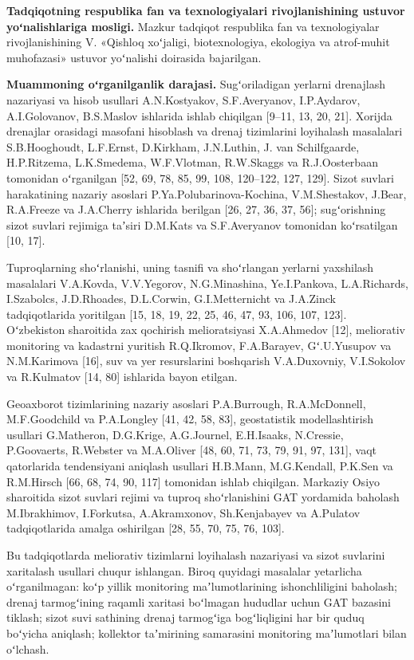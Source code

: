 \documentclass[14pt,a4paper,oneside]{extreport}
\begin{document}
\textbf{Tadqiqotning respublika fan va texnologiyalari rivojlanishining
ustuvor yoʻnalishlariga mosligi.} Mazkur tadqiqot respublika fan va
texnologiyalar rivojlanishining V. «Qishloq xoʻjaligi, biotexnologiya,
ekologiya va atrof-muhit muhofazasi» ustuvor yoʻnalishi doirasida
bajarilgan.

\textbf{Muammoning oʻrganilganlik darajasi.} Sugʻoriladigan yerlarni
drenajlash nazariyasi va hisob usullari A.N.Kostyakov, S.F.Averyanov,
I.P.Aydarov, A.I.Golovanov, B.S.Maslov ishlarida ishlab chiqilgan
{[}9--11, 13, 20, 21{]}. Xorijda drenajlar orasidagi masofani hisoblash
va drenaj tizimlarini loyihalash masalalari S.B.Hooghoudt, L.F.Ernst,
D.Kirkham, J.N.Luthin, J. van Schilfgaarde, H.P.Ritzema, L.K.Smedema,
W.F.Vlotman, R.W.Skaggs va R.J.Oosterbaan tomonidan oʻrganilgan {[}52,
69, 78, 85, 99, 108, 120--122, 127, 129{]}. Sizot suvlari harakatining
nazariy asoslari P.Ya.Polubarinova-Kochina, V.M.Shestakov, J.Bear,
R.A.Freeze va J.A.Cherry ishlarida berilgan {[}26, 27, 36, 37, 56{]};
sugʻorishning sizot suvlari rejimiga taʼsiri D.M.Kats va S.F.Averyanov
tomonidan koʻrsatilgan {[}10, 17{]}.

Tuproqlarning shoʻrlanishi, uning tasnifi va shoʻrlangan yerlarni
yaxshilash masalalari V.A.Kovda, V.V.Yegorov, N.G.Minashina,
Ye.I.Pankova, L.A.Richards, I.Szabolcs, J.D.Rhoades, D.L.Corwin,
G.I.Metternicht va J.A.Zinck tadqiqotlarida yoritilgan {[}15, 18, 19,
22, 25, 46, 47, 93, 106, 107, 123{]}. Oʻzbekiston sharoitida zax
qochirish melioratsiyasi X.A.Ahmedov {[}12{]}, meliorativ monitoring va
kadastrni yuritish R.Q.Ikromov, F.A.Barayev, Gʻ.U.Yusupov va
N.M.Karimova {[}16{]}, suv va yer resurslarini boshqarish V.A.Duxovniy,
V.I.Sokolov va R.Kulmatov {[}14, 80{]} ishlarida bayon etilgan.

Geoaxborot tizimlarining nazariy asoslari P.A.Burrough, R.A.McDonnell,
M.F.Goodchild va P.A.Longley {[}41, 42, 58, 83{]}, geostatistik
modellashtirish usullari G.Matheron, D.G.Krige, A.G.Journel, E.H.Isaaks,
N.Cressie, P.Goovaerts, R.Webster va M.A.Oliver {[}48, 60, 71, 73, 79,
91, 97, 131{]}, vaqt qatorlarida tendensiyani aniqlash usullari
H.B.Mann, M.G.Kendall, P.K.Sen va R.M.Hirsch {[}66, 68, 74, 90, 117{]}
tomonidan ishlab chiqilgan. Markaziy Osiyo sharoitida sizot suvlari
rejimi va tuproq shoʻrlanishini GAT yordamida baholash M.Ibrakhimov,
I.Forkutsa, A.Akramxonov, Sh.Kenjabayev va A.Pulatov tadqiqotlarida
amalga oshirilgan {[}28, 55, 70, 75, 76, 103{]}.

Bu tadqiqotlarda meliorativ tizimlarni loyihalash nazariyasi va sizot
suvlarini xaritalash usullari chuqur ishlangan. Biroq quyidagi masalalar
yetarlicha oʻrganilmagan: koʻp yillik monitoring maʼlumotlarining
ishonchliligini baholash; drenaj tarmogʻining raqamli xaritasi boʻlmagan
hududlar uchun GAT bazasini tiklash; sizot suvi sathining drenaj
tarmogʻiga bogʻliqligini har bir quduq boʻyicha aniqlash; kollektor
taʼmirining samarasini monitoring maʼlumotlari bilan oʻlchash.
\end{document}
